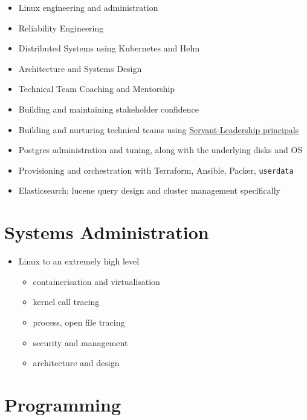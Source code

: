 \documentclass[11pt,a4paper,sans]{article}
\begin{document}
\begin{itemize}
\item Linux engineering and administration
\item Reliability Engineering
\item Distributed Systems using Kubernetes and Helm
\item Architecture and Systems Design
\item Technical Team Coaching and Mentorship
\item Building and maintaining stakeholder confidence
\item Building and nurturing technical teams using \href{https://www.mindtools.com/pages/article/servant-leadership.htm}{Servant-Leadership principals}
\item Postgres administration and tuning, along with the underlying disks and OS
\item Provisioning and orchestration with Terraform, Ansible, Packer, \texttt{userdata}
\item Elasticsearch; lucene query design and cluster management specifically
\end{itemize}

\section{Systems Administration}

\begin{itemize}
\item Linux to an extremely high level
  \begin{itemize}
  \item containerisation and virtualisation
  \item kernel call tracing
  \item process, open file tracing
  \item security and management
  \item architecture and design
  \end{itemize}
\end{itemize}

\section{Programming}
\end{document}
